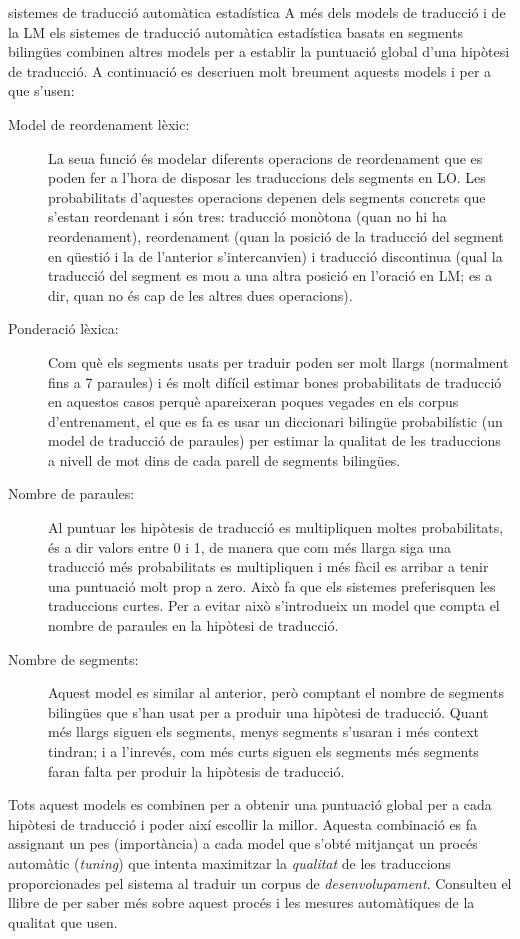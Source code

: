\begin{persabermes}{sistemes de traducció automàtica estadística}
  A més dels models de traducció i de la LM els sistemes de traducció
  automàtica estadística basats en segments bilingües combinen altres
  models per a establir la puntuació global d'una hipòtesi de
  traducció. A continuació es descriuen molt breument aquests models i
  per a que s'usen:
  \begin{description}
  \item[Model de reordenament lèxic:] La seua funció és modelar
    diferents operacions de reordenament que es poden fer a l'hora de
    disposar les traduccions dels segments en LO. Les probabilitats
    d'aquestes operacions depenen dels segments concrets que s'estan
    reordenant i són tres: traducció monòtona (quan no hi ha
    reordenament), reordenament (quan la posició de la traducció del
    segment en qüestió i la de l'anterior s'intercanvien) i traducció
    discontinua (qual la traducció del segment es mou a una altra
    posició en l'oració en LM; es a dir, quan no és cap de les altres
    dues operacions).
  \item[Ponderació lèxica:] Com què els segments usats per traduir
    poden ser molt llargs (normalment fins a 7 paraules) i és molt
    difícil estimar bones probabilitats de traducció en aquestos casos
    perquè apareixeran poques vegades en els corpus d'entrenament, el
    que es fa es usar un diccionari bilingüe probabilístic (un model
    de traducció de paraules) per estimar la qualitat de les
    traduccions a nivell de mot dins de cada parell de segments
    bilingües.
  \item[Nombre de paraules:] Al puntuar les hipòtesis de traducció es
    multipliquen moltes probabilitats, és a dir valors entre 0 i 1, de
    manera que com més llarga siga una traducció més probabilitats es
    multipliquen i més fàcil es arribar a tenir una puntuació molt
    prop a zero. Això fa que els sistemes preferisquen les traduccions
    curtes. Per a evitar això s'introdueix un model que compta el
    nombre de paraules en la hipòtesi de traducció.
  \item[Nombre de segments:] Aquest model es similar al anterior, però
    comptant el nombre de segments bilingües que s'han usat per a
    produir una hipòtesi de traducció. Quant més llargs siguen els
    segments, menys segments s'usaran i més context tindran; i a
    l'inrevés, com més curts siguen els segments més segments faran
    falta per produir la hipòtesis de traducció.
  \end{description}

  Tots aquest models es combinen per a obtenir una puntuació global
  per a cada hipòtesi de traducció i poder així escollir la
  millor. Aquesta combinació es fa assignant un pes (importància) a
  cada model que s'obté mitjançat un procés automàtic (\emph{tuning})
  que intenta maximitzar la \emph{qualitat} de les traduccions
  proporcionades pel sistema al traduir un corpus de
  \emph{desenvolupament}. Consulteu el llibre de \citet{koehnbook} per
  saber més sobre aquest procés i les mesures automàtiques de la
  qualitat que usen.
\end{persabermes}


